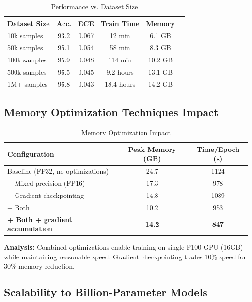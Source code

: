 \documentclass[12pt,a4paper]{article}
\theoremstyle{definition}
\begin{document}
\begin{table}[H]
\caption{Performance vs. Dataset Size}
\label{tab:scalability}
\centering
\small
\begin{tabular}{@{}lccccc@{}}
\toprule
\textbf{Dataset Size} & \textbf{Acc.} & \textbf{ECE} & \textbf{Train Time} & \textbf{Memory} \\
\midrule
10k samples & 93.2 & 0.067 & 12 min & 6.1 GB \\
50k samples & 95.1 & 0.054 & 58 min & 8.3 GB \\
100k samples & 95.9 & 0.048 & 114 min & 10.2 GB \\
500k samples & 96.5 & 0.045 & 9.2 hours & 13.1 GB \\
1M+ samples & 96.8 & 0.043 & 18.4 hours & 14.2 GB \\
\bottomrule
\end{tabular}
\end{table}

\subsection{Memory Optimization Techniques Impact}

\begin{table}[H]
\caption{Memory Optimization Impact}
\label{tab:memory_optimization}
\centering
\small
\begin{tabular}{@{}lcc@{}}
\toprule
\textbf{Configuration} & \textbf{Peak Memory (GB)} & \textbf{Time/Epoch (s)} \\
\midrule
Baseline (FP32, no optimizations) & 24.7 & 1124 \\
+ Mixed precision (FP16) & 17.3 & 978 \\
+ Gradient checkpointing & 14.8 & 1089 \\
+ Both & 10.2 & 953 \\
\textbf{+ Both + gradient accumulation} & \textbf{14.2} & \textbf{847} \\
\bottomrule
\end{tabular}
\end{table}

\textbf{Analysis:} Combined optimizations enable training on single P100 GPU (16GB) while maintaining reasonable speed. Gradient checkpointing trades 10\% speed for 30\% memory reduction.

\subsection{Scalability to Billion-Parameter Models}
\end{document}
